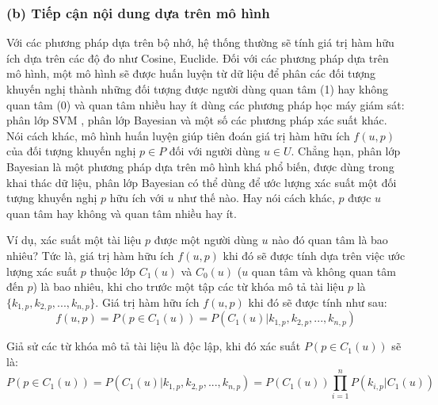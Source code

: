 \subsubsection*{(b) Tiếp cận nội dung dựa trên mô hình}
Với các phương pháp dựa trên bộ nhớ, hệ thống thường sẽ tính giá trị hàm hữu ích dựa trên các độ đo như Cosine, Euclide. Đối với các phương pháp dựa trên mô hình, một mô hình sẽ được huấn luyện từ dữ liệu để phân các đối tượng khuyến nghị thành những đối tượng được người dùng quan tâm (1) hay không quan tâm (0) và quan tâm nhiều hay ít dùng các phương pháp học máy giám sát: phân lớp SVM \cite{Joachims:1998:TCS}, phân lớp Bayesian \cite{Nigam:2000:TCL} và một số các phương pháp xác suất khác. Nói cách khác, mô hình huấn luyện giúp tiên đoán giá trị hàm hữu ích $f(u,p)$ của đối tượng khuyến nghị $p \in P$ đối với người dùng $u \in U$. Chẳng hạn, phân lớp Bayesian là một phương pháp dựa trên mô hình khá phổ biến, được dùng trong khai thác dữ liệu, phân lớp Bayesian có thể dùng để ước lượng xác suất một đối tượng khuyến nghị $p$ hữu ích với $u$ như thế nào. Hay nói cách khác, $p$ được $u$ quan tâm hay không và quan tâm nhiều hay ít.

Ví dụ, xác suất một tài liệu $p$ được một người dùng $u$ nào đó quan tâm là bao nhiêu? Tức là, giá trị hàm hữu ích $f(u,p)$ khi đó sẽ được tính dựa trên việc ước lượng xác suất $p$ thuộc lớp $C_{1}(u)$ và $C_{0}(u)$  ($u$ quan tâm và không quan tâm đến $p$) là bao nhiêu, khi cho trước một tập các từ khóa mô tả tài liệu $p$ là $\{k_{1,p}, k_{2,p}, ..., k_{n,p}\}$. Giá trị hàm hữu ích $f(u,p)$ khi đó sẽ được tính như sau:
\begin{equation}
f(u,p) = P(p \in C_{1}(u)) = P(C_{1}(u)|k_{1,p}, k_{2,p}, ..., k_{n,p})
\end{equation}

Giả sử các từ khóa mô tả tài liệu là độc lập, khi đó xác suất $P(p \in C_{1}(u))$ sẽ là:
\begin{equation}
P(p \in C_{1}(u)) = P(C_{1}(u)|k_{1,p}, k_{2,p}, ..., k_{n,p}) = P(C_{1}(u))\prod_{i=1}^{n}P(k_{i,p}|C_{1}(u))
\end{equation}

